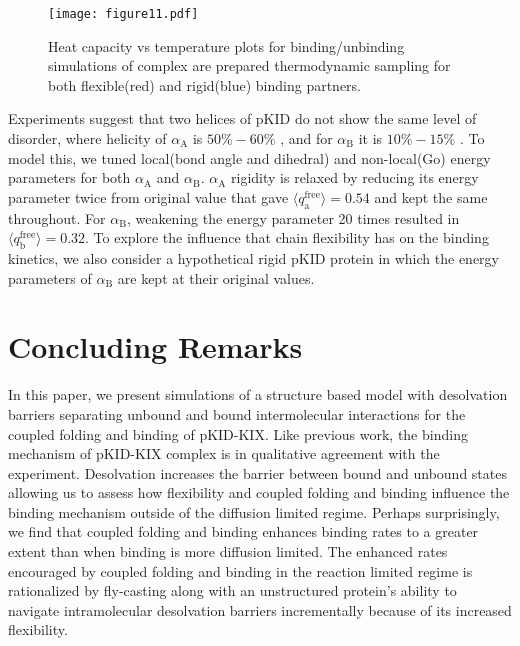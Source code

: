 \documentclass[../talant.diss.submit.tex]{subfiles}
\begin{document}
\begin{figure}[h!]
  \centering
  \texttt{[image: figure11.pdf]}
  \caption{Heat capacity vs temperature plots for binding/unbinding simulations
    of complex are prepared thermodynamic sampling for both flexible(red) and
    rigid(blue) binding partners.}
  \label{fig:figure11}
\end{figure}


Experiments suggest that two helices of pKID do not show the same level of disorder,
where helicity of $\alpha_{\mathrm{A}}$ is $50\%-60\%$ , and for
$\alpha_{\mathrm{B}}$ it is $10\%-15\%$ \cite{radhakrishnan:98}. To model this,
we tuned local(bond angle and dihedral) and non-local(Go) energy parameters for
both $\alpha_{\mathrm{A}}$ and $\alpha_{\mathrm{B}}$. $\alpha_{\mathrm{A}}$
rigidity is relaxed by reducing its energy parameter twice from original value
that gave $\langle q_{\mathrm{a}}^{\mathrm{free}}\rangle=0.54$ and kept the same
throughout. For $\alpha_{\mathrm{B}}$, weakening the energy parameter 20 times
resulted in $\langle q_{\mathrm{b}}^{\mathrm{free}}\rangle = 0.32$.  To explore
the influence that chain flexibility has on the binding kinetics, we also
consider a hypothetical rigid pKID protein in which the energy parameters of
$\alpha_{\mathrm{B}}$ are kept at their original values.

\section{\textbf{Concluding Remarks}}\label{sect:three_nine}
In this paper, we present simulations of a structure based model with
desolvation barriers separating unbound and bound intermolecular interactions
for the coupled folding and binding of pKID-KIX.  Like previous work, the
binding mechanism of pKID-KIX complex is in qualitative agreement with the
experiment\cite{sugase:07}. Desolvation increases the barrier between bound and
unbound states allowing us to assess how flexibility and coupled folding and
binding influence the binding mechanism outside of the diffusion limited
regime.  Perhaps surprisingly, we find that coupled folding and binding enhances
binding rates to a greater extent than when binding is more diffusion limited.
\cite{huang:09,huang:10a,shoeportman:00,turjanski:08,levy:04} 
The enhanced rates encouraged by coupled folding and binding in the reaction limited regime
is rationalized by fly-casting along with an unstructured protein's ability
to navigate intramolecular desolvation barriers incrementally because of its increased flexibility.
\end{document}
